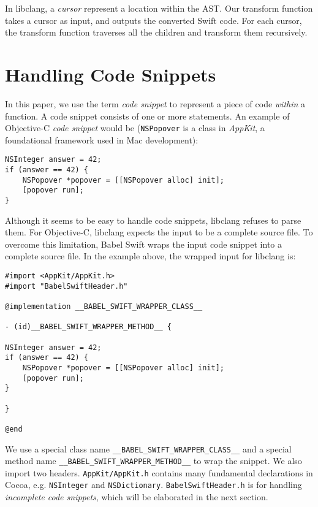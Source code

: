 \documentclass{sfuthesis}
\begin{document}
In libclang, a \emph{cursor} represent a location within the AST. Our transform function takes a cursor as input, and outputs the converted Swift code. For each cursor, the transform function traverses all the children and transform them recursively.

\section{Handling Code Snippets}

In this paper, we use the term \emph{code snippet} to represent a piece of code \emph{within} a function. A code snippet consists of one or more statements. An example of Objective-C \emph{code snippet} would be (\texttt{NSPopover} is a class in \emph{AppKit}, a foundational framework used in Mac development):

\begin{lstlisting}[frame=single]
NSInteger answer = 42;
if (answer == 42) {
    NSPopover *popover = [[NSPopover alloc] init];
    [popover run];
}
\end{lstlisting}

Although it seems to be easy to handle code snippets, libclang refuses to parse them. For Objective-C, libclang expects the input to be a complete source file. To overcome this limitation, Babel Swift wraps the input code snippet into a complete source file. In the example above, the wrapped input for libclang is:

\begin{lstlisting}[frame=single]
#import <AppKit/AppKit.h>
#import "BabelSwiftHeader.h"

@implementation __BABEL_SWIFT_WRAPPER_CLASS__

- (id)__BABEL_SWIFT_WRAPPER_METHOD__ {

NSInteger answer = 42;
if (answer == 42) {
    NSPopover *popover = [[NSPopover alloc] init];
    [popover run];
}

}

@end
\end{lstlisting}

We use a special class name \texttt{\_\_BABEL\_SWIFT\_WRAPPER\_CLASS\_\_} and a special method name \texttt{\_\_BABEL\_SWIFT\_WRAPPER\_METHOD\_\_} to wrap the snippet. We also import two headers. \texttt{AppKit/AppKit.h} contains many fundamental declarations in Cocoa, e.g. \texttt{NSInteger} and \texttt{NSDictionary}. \texttt{BabelSwiftHeader.h} is for handling \emph{incomplete code snippets}, which will be elaborated in the next section.
\end{document}
